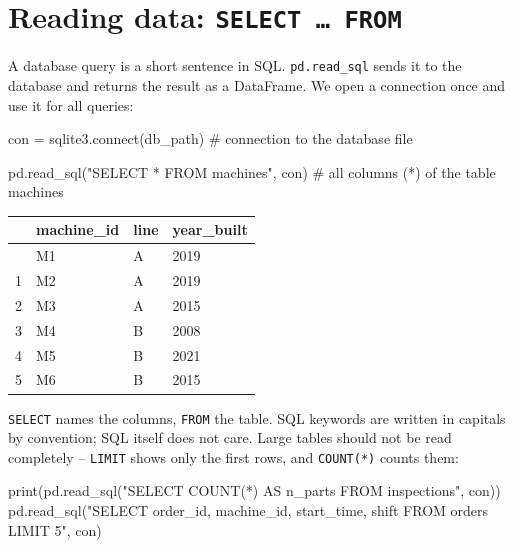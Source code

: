 \documentclass[
  letterpaper,
  DIV=11,
  numbers=noendperiod]{scrreprt}
\newenvironment{Shaded}{\begin{snugshade}}{\end{snugshade}}
\newcommand{\BuiltInTok}[1]{\textcolor[rgb]{0.00,0.23,0.31}{#1}}
\newcommand{\CommentTok}[1]{\textcolor[rgb]{0.37,0.37,0.37}{#1}}
\newcommand{\ExtensionTok}[1]{\textcolor[rgb]{0.00,0.23,0.31}{#1}}
\newcommand{\NormalTok}[1]{\textcolor[rgb]{0.00,0.23,0.31}{#1}}
\newcommand{\OperatorTok}[1]{\textcolor[rgb]{0.37,0.37,0.37}{#1}}
\newcommand{\StringTok}[1]{\textcolor[rgb]{0.13,0.47,0.30}{#1}}
\begin{document}
\section{\texorpdfstring{Reading data:
\texttt{SELECT\ …\ FROM}}{Reading data: SELECT \ldots{} FROM}}\label{reading-data-select-from}

A database query is a short sentence in SQL. \texttt{pd.read\_sql} sends
it to the database and returns the result as a DataFrame. We open a
connection once and use it for all queries:

\begin{Shaded}
\begin{Highlighting}[]
\NormalTok{con }\OperatorTok{=}\NormalTok{ sqlite3.}\ExtensionTok{connect}\NormalTok{(db\_path)          }\CommentTok{\# connection to the database file}

\NormalTok{pd.read\_sql(}\StringTok{"SELECT * FROM machines"}\NormalTok{, con)   }\CommentTok{\# all columns (*) of the table machines}
\end{Highlighting}
\end{Shaded}

\begin{longtable}[]{@{}llll@{}}
\toprule\noalign{}
& machine\_id & line & year\_built \\
\midrule\noalign{}
\endhead
\bottomrule\noalign{}
\endlastfoot
0 & M1 & A & 2019 \\
1 & M2 & A & 2019 \\
2 & M3 & A & 2015 \\
3 & M4 & B & 2008 \\
4 & M5 & B & 2021 \\
5 & M6 & B & 2015 \\
\end{longtable}

\texttt{SELECT} names the columns, \texttt{FROM} the table. SQL keywords
are written in capitals by convention; SQL itself does not care. Large
tables should not be read completely -- \texttt{LIMIT} shows only the
first rows, and \texttt{COUNT(*)} counts them:

\begin{Shaded}
\begin{Highlighting}[]
\BuiltInTok{print}\NormalTok{(pd.read\_sql(}\StringTok{"SELECT COUNT(*) AS n\_parts FROM inspections"}\NormalTok{, con))}
\NormalTok{pd.read\_sql(}\StringTok{"SELECT order\_id, machine\_id, start\_time, shift FROM orders LIMIT 5"}\NormalTok{, con)}
\end{Highlighting}
\end{Shaded}
\end{document}
